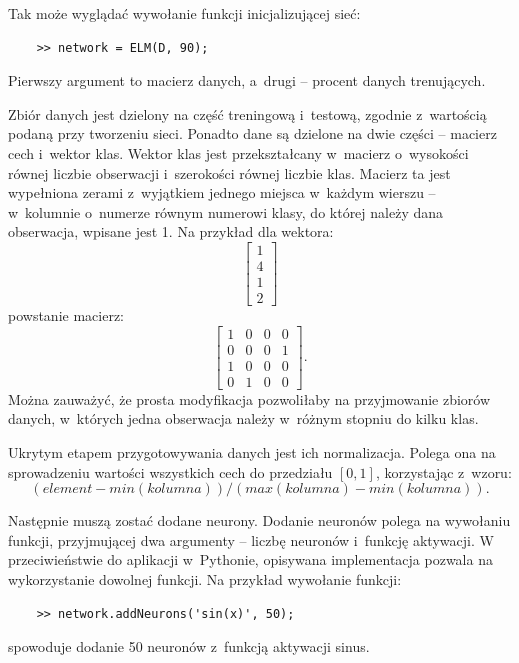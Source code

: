 \documentclass[pl]{minipw} %
\begin{document}
Tak może wyglądać wywołanie funkcji inicjalizującej sieć:
\begin{lstlisting}
	>> network = ELM(D, 90);
\end{lstlisting}
Pierwszy argument to macierz danych, a~drugi -- procent danych trenujących.

Zbiór danych jest dzielony na część treningową i~testową, zgodnie z~wartością podaną przy tworzeniu sieci. 
Ponadto dane są dzielone na dwie części -- macierz cech i~wektor klas.
Wektor klas jest przekształcany w~macierz o~wysokości równej liczbie obserwacji i~szerokości równej liczbie klas.
Macierz ta jest wypełniona zerami z~wyjątkiem jednego miejsca w~każdym wierszu -- w~kolumnie o~numerze równym numerowi klasy, do której należy dana obserwacja, wpisane jest 1.
Na przykład dla wektora:
\[ \begin{bmatrix} 1 \\ 4 \\ 1 \\ 2 \end{bmatrix}\]
powstanie macierz:
\[ \begin{bmatrix} 1&0&0&0 \\ 0&0&0&1 \\ 1&0&0&0 \\ 0&1&0&0 \end{bmatrix}.\]
Można zauważyć, że prosta modyfikacja pozwoliłaby na przyjmowanie zbiorów danych, w~których jedna obserwacja należy w~różnym stopniu do kilku klas.

Ukrytym etapem przygotowywania danych jest ich normalizacja. 
Polega ona na sprowadzeniu wartości wszystkich cech do przedziału $[0, 1]$, korzystając z~wzoru:
\[(element - min(kolumna))/(max(kolumna) - min(kolumna)).\]

Następnie muszą zostać dodane neurony.
Dodanie neuronów polega na wywołaniu funkcji, przyjmującej dwa argumenty -- liczbę neuronów i~funkcję aktywacji.
W przeciwieństwie do aplikacji w~Pythonie, opisywana implementacja pozwala na wykorzystanie dowolnej funkcji.
Na przykład wywołanie funkcji:
\begin{lstlisting}
	>> network.addNeurons('sin(x)', 50);
\end{lstlisting}
spowoduje dodanie 50 neuronów z~funkcją aktywacji sinus.
\end{document}
